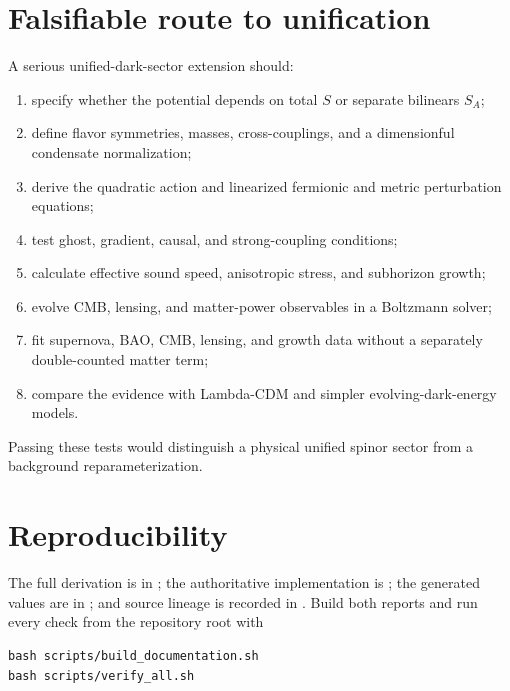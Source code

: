 \documentclass[11pt]{article}
\begin{document}
\section{Falsifiable route to unification}

A serious unified-dark-sector extension should:
\begin{enumerate}
\item specify whether the potential depends on total $S$ or separate
bilinears $S_A$;
\item define flavor symmetries, masses, cross-couplings, and a dimensionful
condensate normalization;
\item derive the quadratic action and linearized fermionic and metric
perturbation equations;
\item test ghost, gradient, causal, and strong-coupling conditions;
\item calculate effective sound speed, anisotropic stress, and subhorizon
growth;
\item evolve CMB, lensing, and matter-power observables in a Boltzmann solver;
\item fit supernova, BAO, CMB, lensing, and growth data without a separately
double-counted matter term;
\item compare the evidence with Lambda-CDM and simpler evolving-dark-energy
models.
\end{enumerate}

Passing these tests would distinguish a physical unified spinor sector from a
background reparameterization.

\section{Reproducibility}

The full derivation is in ; the authoritative
implementation is ; the generated values are in
; and source lineage is recorded in
.  Build both reports and run every check from the
repository root with
\begin{verbatim}
bash scripts/build_documentation.sh
bash scripts/verify_all.sh
\end{verbatim}
\end{document}

